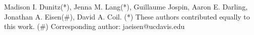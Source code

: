 Madison I. Dunitz(*), Jenna M. Lang(*), Guillaume Jospin, Aaron E. Darling, Jonathan A. Eisen(#), David A. Coil. (*) These authors contributed equally to this work. (#) Corresponding author: jaeisen@ucdavis.edu